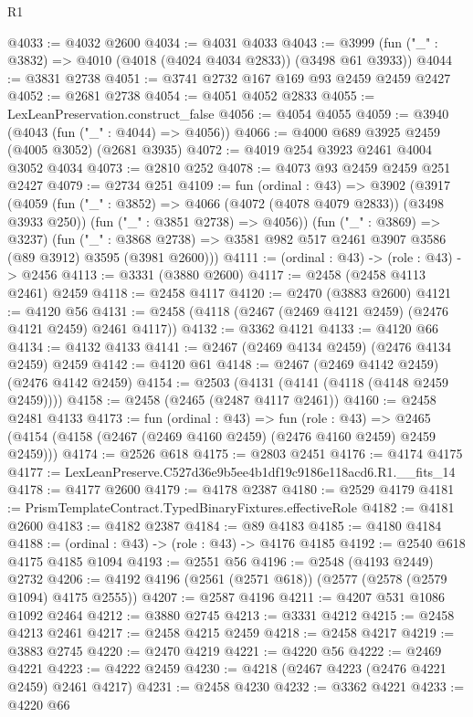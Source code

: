 \begin{lexlean}{R1}
\begin{coremodule}
@4033 := @4032 @2600
@4034 := @4031 @4033
@4043 := @3999 (fun ("_" : @3832) => @4010 (@4018 (@4024 @4034 @2833)) (@3498 @61 @3933))
@4044 := @3831 @2738
@4051 := @3741 @2732 @167 @169 @93 @2459 @2459 @2427
@4052 := @2681 @2738
@4054 := @4051 @4052 @2833
@4055 := LexLeanPreservation.construct_false
@4056 := @4054 @4055
@4059 := @3940 (@4043 (fun ("_" : @4044) => @4056))
@4066 := @4000 @689 @3925 @2459 (@4005 @3052) (@2681 @3935)
@4072 := @4019 @254 @3923 @2461 @4004 @3052 @4034
@4073 := @2810 @252
@4078 := @4073 @93 @2459 @2459 @251 @2427
@4079 := @2734 @251
@4109 := fun (ordinal : @43) =>
  @3902
    (@3917
      (@4059
        (fun ("_" : @3852) => @4066 (@4072 (@4078 @4079 @2833)) (@3498 @3933 @250))
        (fun ("_" : @3851 @2738) => @4056))
      (fun ("_" : @3869) => @3237)
      (fun ("_" : @3868 @2738) =>
      @3581 @982 @517 @2461 @3907 @3586 (@89 @3912) @3595 (@3981 @2600)))
@4111 := (ordinal : @43) -> (role : @43) -> @2456
@4113 := @3331 (@3880 @2600)
@4117 := @2458 (@2458 @4113 @2461) @2459
@4118 := @2458 @4117
@4120 := @2470 (@3883 @2600)
@4121 := @4120 @56
@4131 := @2458 (@4118 (@2467 (@2469 @4121 @2459) (@2476 @4121 @2459) @2461 @4117))
@4132 := @3362 @4121
@4133 := @4120 @66
@4134 := @4132 @4133
@4141 := @2467 (@2469 @4134 @2459) (@2476 @4134 @2459) @2459
@4142 := @4120 @61
@4148 := @2467 (@2469 @4142 @2459) (@2476 @4142 @2459)
@4154 := @2503 (@4131 (@4141 (@4118 (@4148 @2459 @2459))))
@4158 := @2458 (@2465 (@2487 @4117 @2461))
@4160 := @2458 @2481 @4133
@4173 := fun (ordinal : @43) =>
  fun (role : @43) =>
  @2465 (@4154 (@4158 (@2467 (@2469 @4160 @2459) (@2476 @4160 @2459) @2459 @2459)))
@4174 := @2526 @618
@4175 := @2803 @2451
@4176 := @4174 @4175
@4177 := LexLeanPreserve.C527d36e9b5ee4b1df19c9186e118acd6.R1.__fits_14
@4178 := @4177 @2600
@4179 := @4178 @2387
@4180 := @2529 @4179
@4181 := PrismTemplateContract.TypedBinaryFixtures.effectiveRole
@4182 := @4181 @2600
@4183 := @4182 @2387
@4184 := @89 @4183
@4185 := @4180 @4184
@4188 := (ordinal : @43) -> (role : @43) -> @4176 @4185
@4192 := @2540 @618 @4175 @4185 @1094
@4193 := @2551 @56
@4196 := @2548 (@4193 @2449) @2732
@4206 := @4192 @4196 (@2561 (@2571 @618)) (@2577 (@2578 (@2579 @1094) @4175 @2555))
@4207 := @2587 @4196
@4211 := @4207 @531 @1086 @1092 @2464
@4212 := @3880 @2745
@4213 := @3331 @4212
@4215 := @2458 @4213 @2461
@4217 := @2458 @4215 @2459
@4218 := @2458 @4217
@4219 := @3883 @2745
@4220 := @2470 @4219
@4221 := @4220 @56
@4222 := @2469 @4221
@4223 := @4222 @2459
@4230 := @4218 (@2467 @4223 (@2476 @4221 @2459) @2461 @4217)
@4231 := @2458 @4230
@4232 := @3362 @4221
@4233 := @4220 @66

\end{coremodule}
\end{lexlean}
